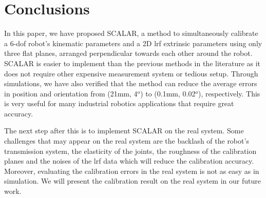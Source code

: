 \section{Conclusions}
\label{sec:conclusions}

In this paper, we have proposed SCALAR, a method to simultaneously calibrate a 6-\ac{dof} robot's kinematic parameters and a 2D \ac{lrf} extrinsic parameters using only three flat planes, arranged perpendicular towards each other around the robot. SCALAR is easier to implement than the previous methods in the literature as it does not require other expensive measurement system or tedious setup. Through simulations, we have also verified that the method can reduce the average errors in position and orientation from (21mm, 4$^o$) to (0.1mm, 0.02$^o$), respectively. This is very useful for many industrial robotics applications that require great accuracy. 

The next step after this is to implement SCALAR on the real system. Some challenges that may appear on the real system are the backlash of the robot's transmission system, the elasticity of the joints, the roughness of the calibration planes and the noises of the \ac{lrf} data which will reduce the calibration accuracy. Moreover, evaluating the calibration errors in the real system is not as easy as in simulation. We will present the calibration result on the real system in our future work. 